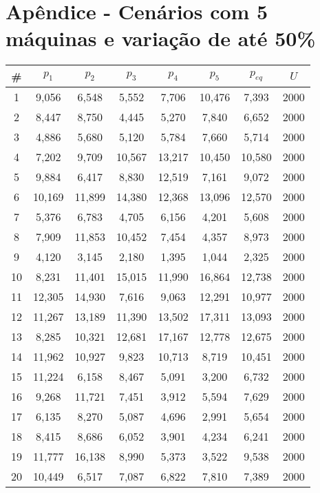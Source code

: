 \newpage
\section{Apêndice - Cenários com 5 máquinas e variação de até 50\%}\label{app:tab05machine50}
\begin{longtable}{cccccccc}
\hline
\#  & $p_1$  & $p_2$  & $p_3$  & $p_4$  & $p_5$  & $p_{eq}$  & $U$    \\ \hline
1   & 9,056  & 6,548  & 5,552  & 7,706  & 10,476 & 7,393  & 2000 \\
2   & 8,447  & 8,750  & 4,445  & 5,270  & 7,840  & 6,652  & 2000 \\
3   & 4,886  & 5,680  & 5,120  & 5,784  & 7,660  & 5,714  & 2000 \\
4   & 7,202  & 9,709  & 10,567 & 13,217 & 10,450 & 10,580 & 2000 \\
5   & 9,884  & 6,417  & 8,830  & 12,519 & 7,161  & 9,072  & 2000 \\
6   & 10,169 & 11,899 & 14,380 & 12,368 & 13,096 & 12,570 & 2000 \\
7   & 5,376  & 6,783  & 4,705  & 6,156  & 4,201  & 5,608  & 2000 \\
8   & 7,909  & 11,853 & 10,452 & 7,454  & 4,357  & 8,973  & 2000 \\
9   & 4,120  & 3,145  & 2,180  & 1,395  & 1,044  & 2,325  & 2000 \\
10  & 8,231  & 11,401 & 15,015 & 11,990 & 16,864 & 12,738 & 2000 \\
11  & 12,305 & 14,930 & 7,616  & 9,063  & 12,291 & 10,977 & 2000 \\
12  & 11,267 & 13,189 & 11,390 & 13,502 & 17,311 & 13,093 & 2000 \\
13  & 8,285  & 10,321 & 12,681 & 17,167 & 12,778 & 12,675 & 2000 \\
14  & 11,962 & 10,927 & 9,823  & 10,713 & 8,719  & 10,451 & 2000 \\
15  & 11,224 & 6,158  & 8,467  & 5,091  & 3,200  & 6,732  & 2000 \\
16  & 9,268  & 11,721 & 7,451  & 3,912  & 5,594  & 7,629  & 2000 \\
17  & 6,135  & 8,270  & 5,087  & 4,696  & 2,991  & 5,654  & 2000 \\
18  & 8,415  & 8,686  & 6,052  & 3,901  & 4,234  & 6,241  & 2000 \\
19  & 11,777 & 16,138 & 8,990  & 5,373  & 3,522  & 9,538  & 2000 \\
20  & 10,449 & 6,517  & 7,087  & 6,822  & 7,810  & 7,389  & 2000 \\

\end{longtable}
